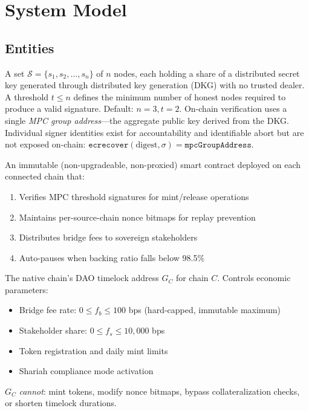 \section{System Model}

\label{sec:model}

\subsection{Entities}

\begin{definition}
A set $\mathcal{S} = \{s_1, s_2, \ldots, s_n\}$ of $n$ nodes, each holding a share of a distributed secret key generated through distributed key generation (DKG) with no trusted dealer. A threshold $t \leq n$ defines the minimum number of honest nodes required to produce a valid signature. Default: $n = 3, t = 2$. On-chain verification uses a single \emph{MPC group address}---the aggregate public key derived from the DKG. Individual signer identities exist for accountability and identifiable abort but are not exposed on-chain: $\texttt{ecrecover}(\text{digest}, \sigma) = \texttt{mpcGroupAddress}$.
\end{definition}

\begin{definition}[OmnichainRouter]
An immutable (non-upgradeable, non-proxied) smart contract deployed on each connected chain that:
\begin{enumerate}[nosep]
  \item Verifies MPC threshold signatures for mint/release operations
  \item Maintains per-source-chain nonce bitmaps for replay prevention
  \item Distributes bridge fees to sovereign stakeholders
  \item Auto-pauses when backing ratio falls below 98.5\%
\end{enumerate}
\end{definition}

\begin{definition}
The native chain's DAO timelock address $G_C$ for chain $C$. Controls economic parameters:
\begin{itemize}[nosep]
  \item Bridge fee rate: $0 \leq f_b \leq 100$ bps (hard-capped, immutable maximum)
  \item Stakeholder share: $0 \leq f_s \leq 10{,}000$ bps
  \item Token registration and daily mint limits
  \item Shariah compliance mode activation
\end{itemize}
$G_C$ \emph{cannot}: mint tokens, modify nonce bitmaps, bypass collateralization checks, or shorten timelock durations.
\end{definition}

